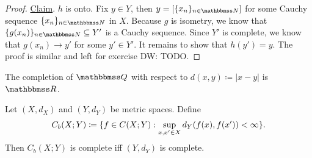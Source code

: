 \documentclass[screen,single]{techreport}
\numberwithin{equation}{section}
\newcommand{\diw}[1]{{\color{Red} DW: #1}}
\begin{document}
\begin{proof}
  \underline{Claim}. $h$ is onto.
  Fix $y \in Y$, then $y = [\{x_n\}_{n\in \bbN}]$ for some Cauchy sequence $\{x_n\}_{n \in \bbN}$ in $X$.
  Because $g$ is isometry, we know that $\{g(x_n)\}_{n \in \bbN} \subseteq Y'$ is a Cauchy sequence.
  Since $Y'$ is complete, we know that $g(x_n) \rightarrow y'$ for some $y' \in Y'$.
  It remains to show that $h(y') = y$.
  The proof is similar and left for exercise \diw{TODO}.
\end{proof}

\begin{remark}\label{Rem:CompletionOfQIsR}
  The completion of $\bbQ$ with respect to $d(x,y) \coloneqq |x-y|$ is $\bbR$.
\end{remark}

\begin{proposition}\label{Prop:BoundedFunctionSpaceCompeteIffRangeComplete}
  Let $(X,d_X)$ and $(Y,d_Y)$ be metric spaces.
  Define
  \[
  C_b(X;Y) \coloneqq \{ { f \in C(X;Y) : \sup_{x,x' \in X} d_Y({ f(x), f(x') }) < \infty } \}.
  \]
  Then $C_b(X;Y)$ is complete iff $(Y,d_Y)$ is complete.
\end{proposition}
\end{document}

